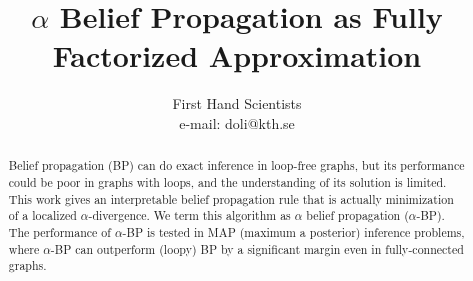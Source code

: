 \documentclass[conference,onecolumn]{IEEEtran}
\begin{document}
\title{$\alpha$ Belief Propagation as Fully Factorized Approximation}
\author{First Hand Scientists\\
e-mail: doli@kth.se}




\maketitle
\begin{abstract}
  Belief propagation (BP) can do exact inference in loop-free graphs, but its performance could be poor in graphs with loops, and the understanding of its solution is limited.
  This work gives an interpretable belief propagation rule that is actually minimization of a localized $\alpha$-divergence. We term this algorithm as $\alpha$ belief propagation ($\alpha$-BP). %
  The performance of $\alpha$-BP is tested in MAP (maximum a posterior) inference problems, where
  $\alpha$-BP can outperform (loopy) BP by a significant margin even in fully-connected graphs. 
  
\end{abstract}
\end{document}
